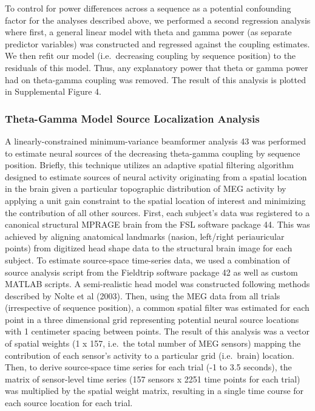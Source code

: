 To control for power differences across a sequence as a potential
confounding factor for the analyses described above, we performed a
second regression analysis where first, a general linear model with
theta and gamma power (as separate predictor variables) was constructed
and regressed against the coupling estimates. We then refit our model
(i.e.~decreasing coupling by sequence position) to the residuals of this
model. Thus, any explanatory power that theta or gamma power had on
theta-gamma coupling was removed. The result of this analysis is plotted
in Supplemental Figure 4.

\subsubsection{Theta-Gamma Model Source Localization
Analysis}\label{theta-gamma-model-source-localization-analysis}

A linearly-constrained minimum-variance beamformer analysis 43 was
performed to estimate neural sources of the decreasing theta-gamma
coupling by sequence position. Briefly, this technique utilizes an
adaptive spatial filtering algorithm designed to estimate sources of
neural activity originating from a spatial location in the brain given a
particular topographic distribution of MEG activity by applying a unit
gain constraint to the spatial location of interest and minimizing the
contribution of all other sources. First, each subject's data was
registered to a canonical structural MPRAGE brain from the FSL software
package 44. This was achieved by aligning anatomical landmarks (nasion,
left/right periauricular points) from digitized head shape data to the
structural brain image for each subject. To estimate source-space
time-series data, we used a combination of source analysis script from
the Fieldtrip software package 42 as well as custom MATLAB scripts. A
semi-realistic head model was constructed following methods described by
Nolte et al (2003). Then, using the MEG data from all trials
(irrespective of sequence position), a common spatial filter was
estimated for each point in a three dimensional grid representing
potential neural source locations with 1 centimeter spacing between
points. The result of this analysis was a vector of spatial weights (1 x
157, i.e.~the total number of MEG sensors) mapping the contribution of
each sensor's activity to a particular grid (i.e.~brain) location. Then,
to derive source-space time series for each trial (-1 to 3.5 seconds),
the matrix of sensor-level time series (157 sensors x 2251 time points
for each trial) was multiplied by the spatial weight matrix, resulting
in a single time course for each source location for each trial.

